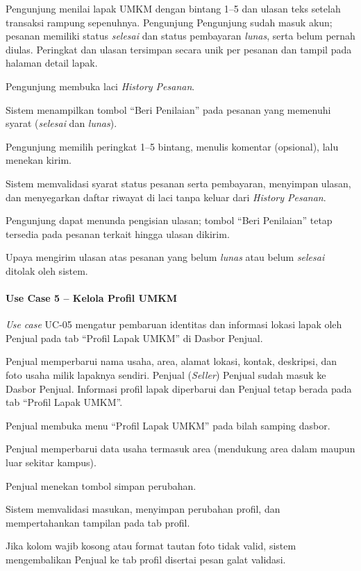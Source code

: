 {Pengunjung menilai lapak UMKM dengan bintang 1--5 dan ulasan teks setelah transaksi rampung sepenuhnya.}
{Pengunjung}
{Pengunjung sudah masuk akun; pesanan memiliki status \textit{selesai} dan status pembayaran \textit{lunas}, serta belum pernah diulas.}
{Peringkat dan ulasan tersimpan secara unik per pesanan dan tampil pada halaman detail lapak.}
{\begin{uclist}
  \item Pengunjung membuka laci \textit{History Pesanan}.
  \item Sistem menampilkan tombol ``Beri Penilaian'' pada pesanan yang memenuhi syarat (\textit{selesai} dan \textit{lunas}).
  \item Pengunjung memilih peringkat 1--5 bintang, menulis komentar (opsional), lalu menekan kirim.
  \item Sistem memvalidasi syarat status pesanan serta pembayaran, menyimpan ulasan, dan menyegarkan daftar riwayat di laci tanpa keluar dari \textit{History Pesanan}.
\end{uclist}}
{\begin{ucbullet}
  \item Pengunjung dapat menunda pengisian ulasan; tombol ``Beri Penilaian'' tetap tersedia pada pesanan terkait hingga ulasan dikirim.
  \item Upaya mengirim ulasan atas pesanan yang belum \textit{lunas} atau belum \textit{selesai} ditolak oleh sistem.
\end{ucbullet}}

\paragraph{Use Case 5 -- Kelola Profil UMKM}
\textit{Use case} UC-05 mengatur pembaruan identitas dan informasi lokasi lapak oleh Penjual pada tab ``Profil Lapak UMKM'' di Dasbor Penjual.

{Penjual memperbarui nama usaha, area, alamat lokasi, kontak, deskripsi, dan foto usaha milik lapaknya sendiri.}
{Penjual (\textit{Seller})}
{Penjual sudah masuk ke Dasbor Penjual.}
{Informasi profil lapak diperbarui dan Penjual tetap berada pada tab ``Profil Lapak UMKM''.}
{\begin{uclist}
  \item Penjual membuka menu ``Profil Lapak UMKM'' pada bilah samping dasbor.
  \item Penjual memperbarui data usaha termasuk area (mendukung area dalam maupun luar sekitar kampus).
  \item Penjual menekan tombol simpan perubahan.
  \item Sistem memvalidasi masukan, menyimpan perubahan profil, dan mempertahankan tampilan pada tab profil.
\end{uclist}}
{\begin{ucbullet}
  \item Jika kolom wajib kosong atau format tautan foto tidak valid, sistem mengembalikan Penjual ke tab profil disertai pesan galat validasi.
\end{ucbullet}}

